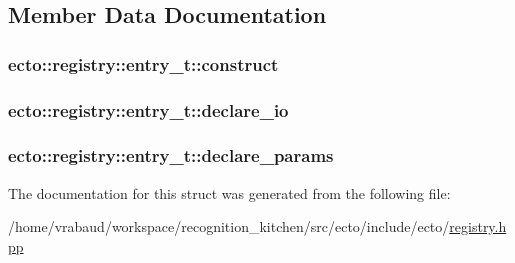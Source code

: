 \subsection{Member Data Documentation}
\hypertarget{structecto_1_1registry_1_1entry__t_ae1c1832273dbd622b1789a82f0832aa8}{
\subsubsection[{construct}]{ ecto\-::registry\-::entry\-\_\-t\-::construct}}\label{structecto_1_1registry_1_1entry__t_ae1c1832273dbd622b1789a82f0832aa8}
\hypertarget{structecto_1_1registry_1_1entry__t_ac052cec6adea69584fbb17f24e147ec2}{
\subsubsection[{declare\-\_\-io}]{ ecto\-::registry\-::entry\-\_\-t\-::declare\-\_\-io}}\label{structecto_1_1registry_1_1entry__t_ac052cec6adea69584fbb17f24e147ec2}
\hypertarget{structecto_1_1registry_1_1entry__t_a0e87799ee057b4509d45eab85def3b80}{
\subsubsection[{declare\-\_\-params}]{ ecto\-::registry\-::entry\-\_\-t\-::declare\-\_\-params}}\label{structecto_1_1registry_1_1entry__t_a0e87799ee057b4509d45eab85def3b80}


The documentation for this struct was generated from the following file\-:\begin{DoxyCompactItemize}
\item 
/home/vrabaud/workspace/recognition\-\_\-kitchen/src/ecto/include/ecto/\hyperlink{registry_8hpp}{registry.\-hpp}\end{DoxyCompactItemize}
